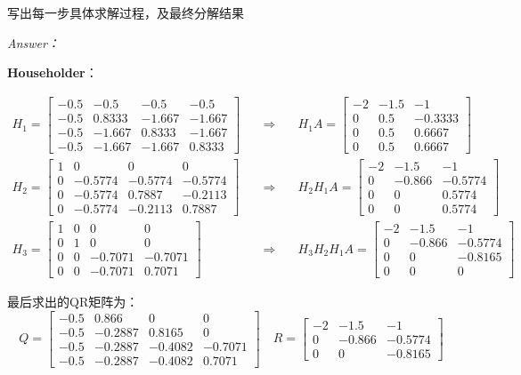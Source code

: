 \documentclass[12pt]{ctexart}
\begin{document}
	写出每一步具体求解过程，及最终分解结果
	
	\textit{Answer：}
	
	\textbf{Householder}：
	
	\begin{equation*}
	\begin{aligned}
	H_1=\begin{bmatrix}
	-0.5&-0.5&-0.5&-0.5 \\
	-0.5&0.8333&-1.667&-1.667 \\
	-0.5&-1.667&0.8333&-1.667 \\
	-0.5&-1.667&-1.667&0.8333
	\end{bmatrix}&\quad\Rightarrow\quad
	&H_1A=\begin{bmatrix}
	-2&-1.5&-1 \\
	0&0.5&-0.3333 \\
	0&0.5&0.6667 \\
	0&0.5&0.6667
	\end{bmatrix} \\
	H_2=\begin{bmatrix}
	1&0&0&0 \\
	0&-0.5774&-0.5774&-0.5774 \\
	0&-0.5774&0.7887&-0.2113 \\
	0&-0.5774&-0.2113&0.7887
	\end{bmatrix}&\quad\Rightarrow\quad
	&H_2H_1A=\begin{bmatrix}
	-2&-1.5&-1 \\
	0&-0.866&-0.5774 \\
	0&0&0.5774 \\
	0&0&0.5774
	\end{bmatrix} \\
	H_3=\begin{bmatrix}
	1&0&0&0 \\
	0&1&0&0 \\
	0&0&-0.7071&-0.7071 \\
	0&0&-0.7071&0.7071
	\end{bmatrix}&\quad\Rightarrow\quad
	&H_3H_2H_1A=\begin{bmatrix}
	-2&-1.5&-1 \\
	0&-0.866&-0.5774 \\
	0&0&-0.8165 \\
	0&0&0
	\end{bmatrix}
	\end{aligned}
	\end{equation*}
	
	最后求出的QR矩阵为：
	\[
	Q=\begin{bmatrix}
	-0.5&0.866&0&0 \\
	-0.5&-0.2887&0.8165&0 \\
	-0.5&-0.2887&-0.4082&-0.7071 \\
	-0.5&-0.2887&-0.4082&0.7071
	\end{bmatrix}\quad
	R=\begin{bmatrix}
	-2&-1.5&-1 \\
	0&-0.866&-0.5774 \\
	0&0&-0.8165
	\end{bmatrix}
	\]
	
\end{document}
